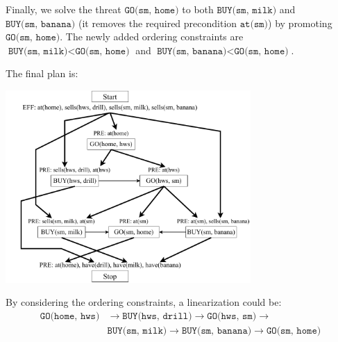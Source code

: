 \begin{example}
\begin{enumerate}
            Finally, we solve the threat $\texttt{GO(sm, home)}$ to 
            both $\texttt{BUY(sm, milk)}$ and $\texttt{BUY(sm, banana)}$ (it removes the required precondition $\texttt{at(sm)}$)
            by promoting $\texttt{GO(sm, home)}$.
            The newly added ordering constraints are 
            $\texttt{BUY(sm, milk)} < \texttt{GO(sm, home)}$ and 
            $\texttt{BUY(sm, banana)} < \texttt{GO(sm, home)}$.
            
            The final plan is:
            \begin{center}
                \includegraphics[width=0.7\textwidth]{img/_pop_example7.pdf}
            \end{center}
            By considering the ordering constraints, a linearization could be:
            \[ 
                \begin{split}
                    \texttt{GO(home, hws)} &\rightarrow  
                    \texttt{BUY(hws, drill)} \rightarrow  
                    \texttt{GO(hws, sm)} \rightarrow\\
                    &\texttt{BUY(sm, milk)} \rightarrow  
                    \texttt{BUY(sm, banana)} \rightarrow  
                    \texttt{GO(sm, home)} 
                \end{split}
            \]
    \end{enumerate}
\end{example}